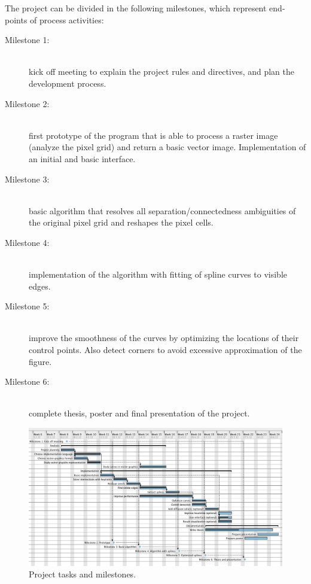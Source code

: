 \documentclass[]{usiinfbachelorproject}
\begin{document}
\noindent The project can be divided in the following milestones, which represent end-points of process activities:
\begin{description}
	\item[Milestone 1:]~\\
	kick off meeting to explain the project rules and directives, and plan the development process.
	\item[Milestone 2:]~\\
	first prototype of the program that is able to process a raster image (analyze the pixel grid) and return a basic vector image. Implementation of an initial and basic interface.
	\item[Milestone 3:]~ \\
	basic algorithm that resolves all separation/connectedness ambiguities of the original pixel grid and reshapes the pixel cells.
	\item[Milestone 4:]~ \\
	implementation of the algorithm with fitting of spline curves to visible edges.
	\item[Milestone 5:]~ \\
	improve the smoothness of the curves by optimizing the locations of their control points. Also detect corners to avoid excessive approximation of the figure.
	\item[Milestone 6:]~ \\
	complete thesis, poster and final presentation of the project.
\end{description}

\begin{figure}[!ht]
	\centering
	\includegraphics[width=1\textwidth]{img/gantt_plan.png}
	\caption{Project tasks and milestones.}
\end{figure}

\newpage
\end{document}
